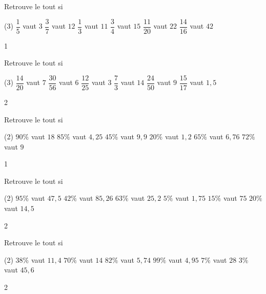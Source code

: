 \documentclass[a4paper,11pt]{report}
\begin{document}
\begin{exo}{
Retrouve le tout si
	\begin{tasks}(3)
	\task $\dfrac{1}{5}$ vaut $3$
	\task $\dfrac{3}{7}$ vaut $12$
	\task $\dfrac{1}{3}$ vaut $11$
	\task $\dfrac{3}{4}$ vaut $15$
	\task $\dfrac{11}{20}$ vaut $22$
	\task $\dfrac{14}{16}$ vaut $42$
	\end{tasks}
}{1}\end{exo}
\begin{exo}{
Retrouve le tout si
	\begin{tasks}(3)
	\task $\dfrac{14}{20}$ vaut $7$
	\task $\dfrac{30}{56}$ vaut $6$
	\task $\dfrac{12}{25}$ vaut $3$
	\task $\dfrac{7}{3}$ vaut $14$
	\task $\dfrac{24}{50}$ vaut $9$
	\task $\dfrac{15}{17}$ vaut $1,5$
	\end{tasks}
}{2}\end{exo}
\begin{exo}{
Retrouve le tout si
	\begin{tasks}(2)
	\task $90\%$ vaut $18$
	\task $85\%$ vaut $4,25$
	\task $45\%$ vaut $9,9$
	\task $20\%$ vaut $1,2$
	\task $65\%$ vaut $6,76$
	\task $72\%$ vaut $9$
	\end{tasks}
}{1}\end{exo}

\begin{exo}{
Retrouve le tout si
	\begin{tasks}(2)
	\task $95\%$ vaut $47,5$
	\task $42\%$ vaut $85,26$
	\task $63\%$ vaut $25,2$
	\task $5\%$ vaut $1,75$
	\task $15\%$ vaut $75$
	\task $20\%$ vaut $14,5$
	\end{tasks}
}{2}\end{exo}
\begin{exo}{
Retrouve le tout si
	\begin{tasks}(2)
	\task $38\%$ vaut $11,4$
	\task $70\%$ vaut $14$
	\task $82\%$ vaut $5,74$
	\task $99\%$ vaut $4,95$
	\task $7\%$ vaut $28$
	\task $3\%$ vaut $45,6$
	\end{tasks}
}{2}\end{exo}
\end{document}
